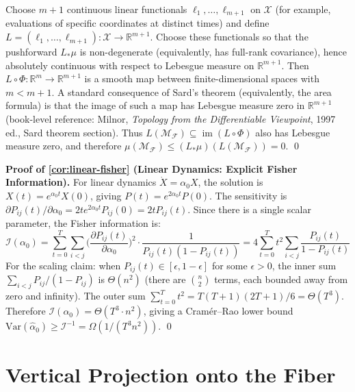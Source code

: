 \documentclass{article}
\newcommand{\RR}{\mathbb{R}}
\DeclareMathOperator{\im}{im}
\theoremstyle{plain}
\theoremstyle{definition}
\theoremstyle{remark}
\begin{document}
Choose $m + 1$ continuous linear functionals $\ell_1, \ldots, \ell_{m+1}$ on $\mathcal{X}$ (for example, evaluations of specific coordinates at distinct times) and define $L = (\ell_1, \ldots, \ell_{m+1}): \mathcal{X} \to \RR^{m+1}$.
Choose these functionals so that the pushforward $L_* \mu$ is non-degenerate (equivalently, has full-rank covariance), hence absolutely continuous with respect to Lebesgue measure on $\RR^{m+1}$.
Then $L \circ \Phi: \RR^m \to \RR^{m+1}$ is a smooth map between finite-dimensional spaces with $m < m+1$.
A standard consequence of Sard's theorem (equivalently, the area formula) is that the image of such a map has Lebesgue measure zero in $\RR^{m+1}$ (book-level reference: Milnor, \emph{Topology from the Differentiable Viewpoint}, 1997 ed., Sard theorem section).
Thus $L(\mathcal{M}_\mathcal{F}) \subseteq \im(L \circ \Phi)$ also has Lebesgue measure zero, and therefore
$\mu(\mathcal{M}_\mathcal{F}) \le (L_* \mu)(L(\mathcal{M}_\mathcal{F})) = 0$. \qed

\medskip

\textbf{Proof of \cref{cor:linear-fisher} (Linear Dynamics: Explicit Fisher Information).}
For linear dynamics $\dot{X} = \alpha_0 X$, the solution is $X(t) = e^{\alpha_0 t} X(0)$, giving $P(t) = e^{2 \alpha_0 t} P(0)$.
The sensitivity is $\partial P_{ij}(t) / \partial \alpha_0 = 2t e^{2 \alpha_0 t} P_{ij}(0) = 2t P_{ij}(t)$.
Since there is a single scalar parameter, the Fisher information is:
\begin{equation}
\mathcal{I}(\alpha_0) = \sum_{t=0}^T \sum_{i < j} \biggl(\frac{\partial P_{ij}(t)}{\partial \alpha_0}\biggr)^2 \cdot \frac{1}{P_{ij}(t)(1 - P_{ij}(t))} = 4 \sum_{t=0}^T t^2 \sum_{i < j} \frac{P_{ij}(t)}{1 - P_{ij}(t)}
\end{equation}
For the scaling claim: when $P_{ij}(t) \in [\epsilon, 1 - \epsilon]$ for some $\epsilon > 0$, the inner sum $\sum_{i < j} P_{ij} / (1 - P_{ij})$ is $\Theta(n^2)$ (there are $\binom{n}{2}$ terms, each bounded away from zero and infinity).
The outer sum $\sum_{t=0}^T t^2 = T(T+1)(2T+1)/6 = \Theta(T^3)$.
Therefore $\mathcal{I}(\alpha_0) = \Theta(T^3 \cdot n^2)$, giving a Cram\'er--Rao lower bound $\mathrm{Var}(\hat{\alpha}_0) \ge \mathcal{I}^{-1} = \Omega(1/(T^3 n^2))$. \qed


\section{Vertical Projection onto the Fiber}\label{app:vertical-projection}
\end{document}
